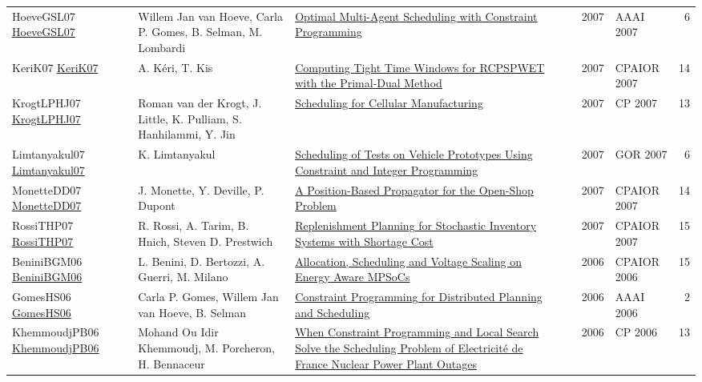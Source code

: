 {\begin{longtable}{p{3cm}p{6cm}p{7cm}rrrp{3cm}r}
HoeveGSL07 \href{http://www.aaai.org/Library/AAAI/2007/aaai07-291.php}{HoeveGSL07} & Willem Jan van Hoeve, Carla P. Gomes, B. Selman, M. Lombardi & \href{papers/HoeveGSL07.pdf}{Optimal Multi-Agent Scheduling with Constraint Programming} &  & \cite{HoeveGSL07} & 2007 & AAAI 2007 & 6\\
KeriK07 \href{https://doi.org/10.1007/978-3-540-72397-4\_10}{KeriK07} & A. K{\'{e}}ri, T. Kis & \href{papers/KeriK07.pdf}{Computing Tight Time Windows for {RCPSPWET} with the Primal-Dual Method} &  & \cite{KeriK07} & 2007 & CPAIOR 2007 & 14\\
KrogtLPHJ07 \href{https://doi.org/10.1007/978-3-540-74970-7\_10}{KrogtLPHJ07} & Roman van der Krogt, J. Little, K. Pulliam, S. Hanhilammi, Y. Jin & \href{papers/KrogtLPHJ07.pdf}{Scheduling for Cellular Manufacturing} &  & \cite{KrogtLPHJ07} & 2007 & CP 2007 & 13\\
Limtanyakul07 \href{https://doi.org/10.1007/978-3-540-77903-2\_65}{Limtanyakul07} & K. Limtanyakul & \href{papers/Limtanyakul07.pdf}{Scheduling of Tests on Vehicle Prototypes Using Constraint and Integer Programming} &  & \cite{Limtanyakul07} & 2007 & GOR 2007 & 6\\
MonetteDD07 \href{https://doi.org/10.1007/978-3-540-72397-4\_14}{MonetteDD07} & J. Monette, Y. Deville, P. Dupont & \href{papers/MonetteDD07.pdf}{A Position-Based Propagator for the Open-Shop Problem} &  & \cite{MonetteDD07} & 2007 & CPAIOR 2007 & 14\\
RossiTHP07 \href{https://doi.org/10.1007/978-3-540-72397-4\_17}{RossiTHP07} & R. Rossi, A. Tarim, B. Hnich, Steven D. Prestwich & \href{papers/RossiTHP07.pdf}{Replenishment Planning for Stochastic Inventory Systems with Shortage Cost} &  & \cite{RossiTHP07} & 2007 & CPAIOR 2007 & 15\\
BeniniBGM06 \href{https://doi.org/10.1007/11757375\_6}{BeniniBGM06} & L. Benini, D. Bertozzi, A. Guerri, M. Milano & \href{papers/BeniniBGM06.pdf}{Allocation, Scheduling and Voltage Scaling on Energy Aware MPSoCs} &  & \cite{BeniniBGM06} & 2006 & CPAIOR 2006 & 15\\
GomesHS06 \href{http://www.aaai.org/Library/Symposia/Spring/2006/ss06-04-024.php}{GomesHS06} & Carla P. Gomes, Willem Jan van Hoeve, B. Selman & \href{papers/GomesHS06.pdf}{Constraint Programming for Distributed Planning and Scheduling} &  & \cite{GomesHS06} & 2006 & AAAI 2006 & 2\\
KhemmoudjPB06 \href{https://doi.org/10.1007/11889205\_21}{KhemmoudjPB06} & Mohand Ou Idir Khemmoudj, M. Porcheron, H. Bennaceur & \href{papers/KhemmoudjPB06.pdf}{When Constraint Programming and Local Search Solve the Scheduling Problem of Electricit{\'{e}} de France Nuclear Power Plant Outages} &  & \cite{KhemmoudjPB06} & 2006 & CP 2006 & 13\\

\end{longtable}}
